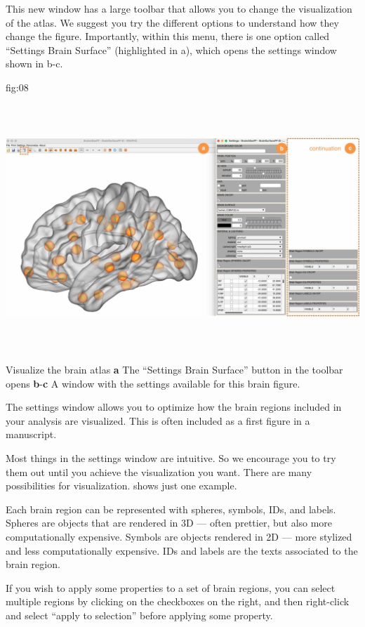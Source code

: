 \documentclass[justified]{tufte-handout}
\begin{document}
This new window has a large toolbar that allows you to change the visualization of the atlas. We suggest you try the different options to understand how they change the figure. Importantly, within this menu, there is one option called ``Settings Brain Surface'' (highlighted in a), which opens the settings window shown in b-c.

	{fig:08}
	{\includegraphics[height=10cm]{fig08.jpg}}
	{Visualize the brain atlas}
	{
	{\bf a} The ``Settings Brain Surface'' button in the toolbar opens {\bf b}-{\bf c} A window with the settings available for this brain figure.
	}

The settings window allows you to optimize how the brain regions included in your analysis are visualized. This is often included as a first figure in a manuscript.

Most things in the settings window are intuitive. So we encourage you to try them out until you achieve the visualization you want. There are many possibilities for visualization.  shows just one example.

Each brain region can be represented with spheres, symbols, IDs, and labels.
Spheres are objects that are rendered in 3D --- often prettier, but also more computationally expensive.
Symbols are objects rendered in 2D --- more stylized and less computationally expensive.
IDs and labels are the texts associated to the brain region.

If you wish to apply some properties to a set of brain regions, you can select multiple regions by clicking on the checkboxes on the right, and then right-click and select ``apply to selection'' before applying some property.
\end{document}

